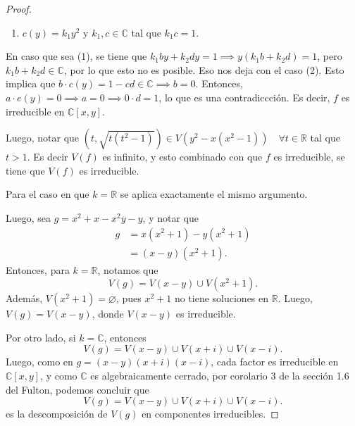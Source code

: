 \documentclass{amsart}
\theoremstyle{plain}
\newcommand{\R}{\mathbb{R}}
\newcommand{\C}{\mathbb{C}}
\begin{document}
\begin{proof}
\begin{enumerate}
			\item $c(y) = k_{1}y^{2}$ y $k_{1},c \in \C$ tal que $k_{1} c = 1$.
		\end{enumerate}
		En caso que sea (1), se tiene que $k_{1}by + k_{2}dy = 1 \implies y(k_{1}b + k_{2}d) = 1$, pero $k_{1}b + k_{2}d \in \C$, por lo que esto no es posible. Eso nos  deja con el caso (2). Esto implica que $b \cdot c(y) = 1 - cd \in \C \implies b = 0$. Entonces, $a \cdot e(y) = 0 \implies a = 0 \implies 0 \cdot d = 1$, lo que es una contradiccción. Es decir, $f$ es irreducible en $\C[x,y]$. \par
		Luego, notar que $(t, \sqrt{t(t^{2} - 1)}) \in V(y^{2} - x(x^{2} -1 )) \quad \forall t \in \R$ tal que $t > 1$. Es decir $V(f)$ es infinito, y esto combinado con que $f$ es irreducible, se tiene que $V(f)$ es irreducible. \par
		Para el caso en que $k = \R$ se aplica exactamente el mismo argumento. \par
		Luego, sea $g = x^{2} + x - x^{2}y - y$, y notar que 
		\begin{align*}
			g &= x(x^{2} + 1) - y(x^{2} + 1) \\
			&= (x - y)(x^{2} + 1)
		.\end{align*}
		Entonces, para $k = \R$, notamos que
		\[ V(g) = V(x - y) \cup V(x^{2} + 1). \]
		Además, $V(x^{2} + 1) = \varnothing$, pues $x^{2} + 1$ no tiene soluciones en $\R$. Luego, $V(g) = V(x - y)$, donde $V(x - y)$ es irreducible. \par
		Por otro lado, si $k = \C$, entonces
		\[ V(g) = V(x - y) \cup V(x + i) \cup V(x - i). \]
		Luego, como en $g = (x - y)(x + i)(x - i)$, cada factor es irreducible en $\C[x,y]$, y como $\C$ es algebraicamente cerrado, por corolario 3 de la sección 1.6 del Fulton, podemos concluir que
		\[ V(g) = V(x - y) \cup V(x + i) \cup V(x - i). \]
		es la descomposición de $V(g)$ en componentes irreducibles.
	\end{proof}
	
\end{document}
